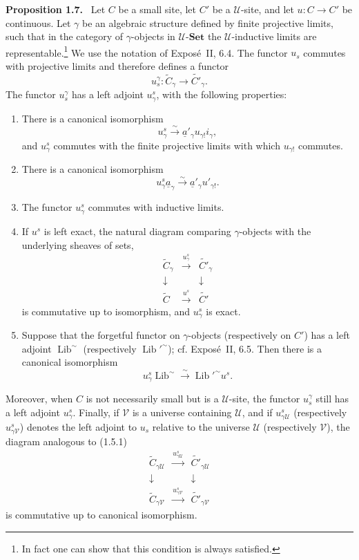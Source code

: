 \documentclass[11pt]{article}
\newcommand{\U}{\mathcal{U}}
\newcommand{\V}{\mathcal{V}}
\newcommand{\Set}{\mathbf{Set}}
\newcommand{\Lib}{\operatorname{Lib}}
\newenvironment{statement}[1]{\par\medskip\noindent\textbf{#1.}\ }{\par\medskip}
\begin{document}
\begin{statement}{Proposition 1.7}
Let \(C\) be a small site, let \(C'\) be a \(\U\)-site, and let \(u:C\to C'\) be continuous. Let \(\gamma\) be an algebraic structure defined by finite projective limits, such that in the category of \(\gamma\)-objects in \(\U\)-\(\Set\) the \(\U\)-inductive limits are representable.\footnote{In fact one can show that this condition is always satisfied.} We use the notation of Expos\'e~II, 6.4. The functor \(u_s\) commutes with projective limits and therefore defines a functor
\[
u_s^\gamma:\widetilde C_\gamma\longrightarrow \widetilde{C'}_\gamma.
\]
The functor \(u_s^\gamma\) has a left adjoint \(u^s_\gamma\), with the following properties:
\begin{enumerate}[label=\arabic*)]
\item There is a canonical isomorphism
\[
u^s_\gamma\xrightarrow{\sim}\underline a'_\gamma u_{\gamma!}i_\gamma,
\]
and \(u^s_\gamma\) commutes with the finite projective limits with which \(u_{\gamma!}\) commutes.
\item There is a canonical isomorphism
\[
u^s_\gamma\underline a_\gamma\xrightarrow{\sim}\underline a'_\gamma u'_{\gamma!}.
\]
\item The functor \(u^s_\gamma\) commutes with inductive limits.
\item If \(u^s\) is left exact, the natural diagram comparing \(\gamma\)-objects with the underlying sheaves of sets,
\[
\begin{array}{ccc}
\widetilde C_\gamma & \xrightarrow{u^s_\gamma} & \widetilde{C'}_\gamma\\
\downarrow && \downarrow\\
\widetilde C & \xrightarrow{u^s} & \widetilde{C'}
\end{array}
\]
is commutative up to isomorphism, and \(u^s_\gamma\) is exact.
\item Suppose that the forgetful functor on \(\gamma\)-objects (respectively on \(C'\)) has a left adjoint \(\Lib^{\sim}\) (respectively \({\Lib'}^{\sim}\)); cf. Expos\'e~II, 6.5. Then there is a canonical isomorphism
\[
u^s_\gamma\Lib^{\sim}\xrightarrow{\sim}{\Lib'}^{\sim}u^s.
\]
\end{enumerate}
Moreover, when \(C\) is not necessarily small but is a \(\U\)-site, the functor \(u_s^\gamma\) still has a left adjoint \(u^s_\gamma\). Finally, if \(\V\) is a universe containing \(\U\), and if \(u^s_{\gamma\U}\) (respectively \(u^s_{\gamma\V}\)) denotes the left adjoint to \(u_s\) relative to the universe \(\U\) (respectively \(\V\)), the diagram analogous to (1.5.1)
\[
\begin{array}{ccc}
\widetilde C_{\gamma\U} & \xrightarrow{u^s_{\gamma\U}} & \widetilde{C'}_{\gamma\U}\\
\downarrow && \downarrow\\
\widetilde C_{\gamma\V} & \xrightarrow{u^s_{\gamma\V}} & \widetilde{C'}_{\gamma\V}
\end{array}
\tag{1.7.1}
\]
is commutative up to canonical isomorphism.
\end{statement}
\end{document}
